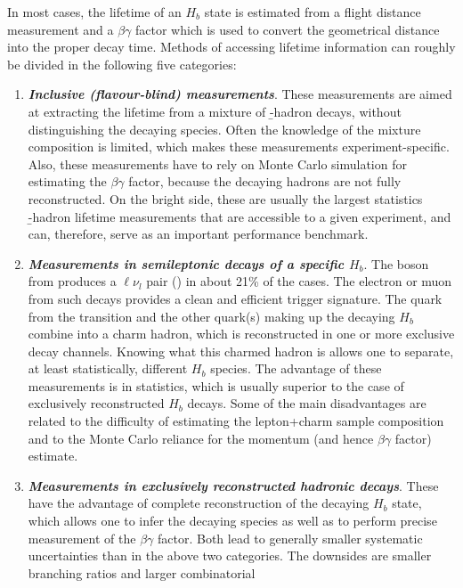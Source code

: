 In most cases, the lifetime of an $H_b$ state is estimated from a flight
distance measurement
and a $\beta\gamma$ factor which is used to convert the geometrical
distance into the proper decay time.  Methods of accessing lifetime
information can roughly be divided in the following five categories:
\begin{enumerate}
\item {\bf\em Inclusive (flavour-blind) measurements}.  These
  measurements are aimed at extracting the lifetime from a mixture of
  \b-hadron decays, without distinguishing the decaying species.  Often
  the knowledge of the mixture composition is limited, which makes these
  measurements experiment-specific.  Also, these
  measurements have to rely on Monte Carlo simulation for estimating the
  $\beta\gamma$ factor, because the decaying hadrons are not fully
  reconstructed.  On the bright side, these are usually the largest
  statistics \b-hadron lifetime measurements that are accessible to a
  given experiment, and can, therefore, serve as an important
  performance benchmark.
\item {\bf\em Measurements in semileptonic decays of a specific
  {\boldmath $H_b$\unboldmath}}.  The  boson from 
  produces a $\ell\nu_l$ pair () in about 21\% of the
  cases.  The electron or muon from such decays provides a clean and efficient
  trigger signature.
  The  quark from the  transition and the other
  quark(s) making up the decaying $H_b$ combine into a charm hadron,
  which is reconstructed in one or more exclusive decay channels.
  Knowing what this charmed hadron is allows one to separate, at least
  statistically, different $H_b$ species.  The advantage of these
  measurements is in statistics, which is usually superior to the case of
  exclusively reconstructed $H_b$ decays.  Some of the main
  disadvantages are related to the difficulty of estimating the lepton+charm
  sample composition and to the Monte Carlo reliance for
  the momentum (and hence $\beta\gamma$ factor) estimate.
\item {\bf\em Measurements in exclusively reconstructed hadronic decays}.
  These
  have the advantage of complete reconstruction of the decaying $H_b$ state, 
  which allows one to infer the decaying species as well as to perform precise
  measurement of the $\beta\gamma$ factor.  Both lead to generally
  smaller systematic uncertainties than in the above two categories.
  The downsides are smaller branching ratios and larger combinatorial

\end{enumerate}
